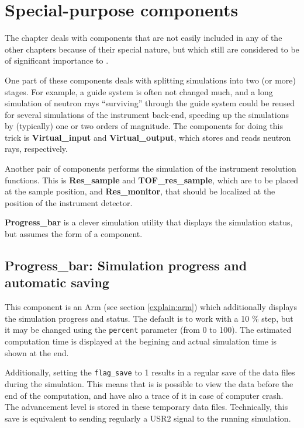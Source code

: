\chapter{Special-purpose components}

The chapter deals with components that are not easily included
in any of the other chapters because of their special nature,
but which still are considered to be of significant importance
to \MCS .

One part of these components deals with splitting simulations
into two (or more) stages. For example, a guide system is often
not changed much, and a long simulation of neutron rays
``surviving'' through the guide system could be reused
for several simulations of the instrument back-end, speeding up
the simulations by (typically) one or two orders of magnitude.
The components for doing this trick is {\bf Virtual\_input} and
{\bf Virtual\_output}, which stores and reads neutron rays, respectively.

Another pair of components performs the simulation of the instrument
resolution functions. This is {\bf Res\_sample} and {\bf TOF\_res\_sample}, 
which are to be
placed at the sample position, and {\bf Res\_monitor}, that should
be localized at the position of the instrument detector.

{\bf Progress\_bar} is a clever simulation utility that displays the simulation
status, but assumes the form of a component.

\newpage


\newpage


\newpage


\newpage


\newpage


\newpage
\section{Progress\_bar: Simulation progress and automatic saving}
\label{s:progress-bar}

This component is an Arm (see section \ref{explain:arm}) which 
additionally displays the simulation progress and status. 
The default is to work with a 10 \% step, but it may be changed using 
the \verb+percent+ parameter (from 0 to 100). 
The estimated computation time is displayed at the begining 
and actual simulation time is shown at the end.

Additionally, setting the \verb+flag_save+ to 1 results in 
a regular save of the data files during the simulation. 
This means that is is possible to view the data before the end 
of the computation, and have also a trace of it in case of 
computer crash. The advancement level is stored in these temporary 
data files. Technically, this save is equivalent to sending regularly 
a USR2 signal to the running simulation.
